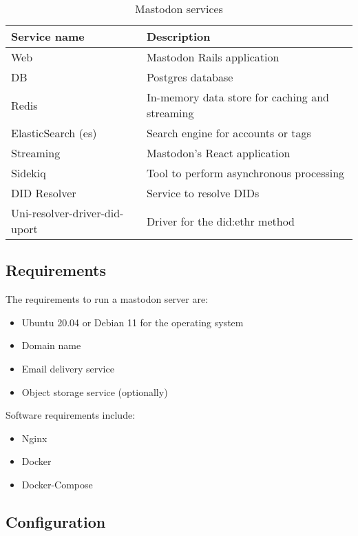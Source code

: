 \begin{table}[H]
  \centering
  \begin{tabular}{|p{4cm}|p{10cm}| }
    \hline
    Service name & Description \\
    \hline
    \hline
    Web & Mastodon Rails application \\
    \hline
    DB & Postgres database \\
    \hline
    Redis & In-memory data store for caching and streaming \\
    \hline
    ElasticSearch (es) & Search engine for accounts or tags\\
    \hline
    Streaming & Mastodon's React application \\
    \hline
    Sidekiq & Tool to perform asynchronous processing\\
    \hline
    DID Resolver & Service to resolve DIDs \\
    \hline
    Uni-resolver-driver-did-uport & Driver for the did:ethr method\\
    \hline
  \end{tabular}
  \caption{Mastodon services}
  \label{table:mastodon_service}
\end{table}

\subsection{Requirements}

The requirements to run a mastodon server are:
\begin{itemize}
  \item Ubuntu 20.04 or Debian 11 for the operating system
  \item Domain name
  \item Email delivery service
  \item Object storage service (optionally)
\end{itemize}

Software requirements include: 
\begin{itemize}
  \item Nginx
  \item Docker
  \item Docker-Compose
\end{itemize}


\subsection{Configuration}

